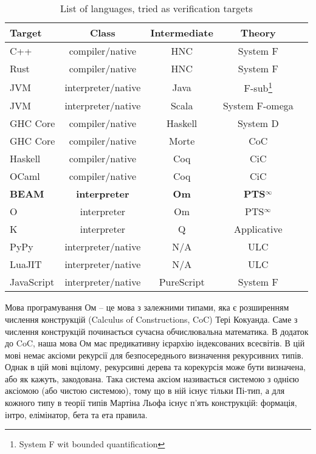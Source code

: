 \begin{table}[h]
\begin{center}
\caption{List of languages, tried as verification targets}
\label{tab:a}
\begin{tabular}{lcccc}
\hline
{\bf Target} & {\bf Class} & {\bf Intermediate} & {\bf Theory}\\
\hline
C++        & compiler/native      & HNC & System F\\
Rust       & compiler/native      & HNC & System F\\
JVM        & interpreter/native   & Java    & F-sub\footnote{System F wit bounded quantification}\\
JVM        & interpreter/native   & Scala   & System F-omega\\
GHC Core   & compiler/native      & Haskell & System D\\
GHC Core   & compiler/native      & Morte   & CoC\\
Haskell    & compiler/native      & Coq     & CiC\\
OCaml      & compiler/native      & Coq     & CiC\\
{\bf BEAM} & {\bf interpreter} & {\bf Om}   & {\bf PTS$^\infty$} \\
O          & interpreter          & Om  & PTS$^\infty$ \\
K          & interpreter          & Q   & Applicative \\
PyPy       & interpreter/native   & N/A & ULC \\
LuaJIT     & interpreter/native   & N/A & ULC \\
JavaScript & interpreter/native & PureScript & System F\\
\hline
\end{tabular}
\end{center}
\end{table}

Мова програмування Ом -- це мова з залежними типами, яка є розширенням
числення конструкцій (Calculus of Constructions, CoC) Тері Кокуанда. Саме з числення
конструкцій починається сучасна обчислювальна математика. В додаток до CoC,
наша мова Ом має предикативну ієрархію індексованих всесвітів. В цій мові немає
аксіоми рекурсії для безпосереднього визначення рекурсивних типів. Однак в цій мові
вцілому, рекурсивні дерева та корекурсія може бути визначена, або як кажуть, закодована.
Така система аксіом називається системою з однією аксіомою (або чистою системою), тому що в ній
існує тільки Пі-тип, а для кожного типу в теорії типів Мартіна Льофа існує п'ять
конструкцій: формація, інтро, елімінатор, бета та ета правила.

